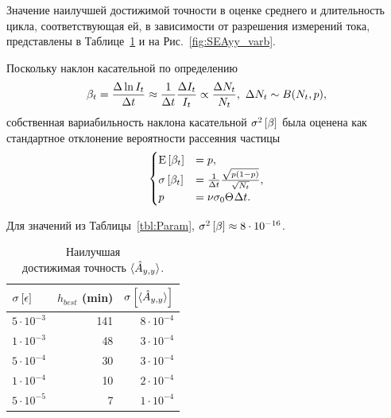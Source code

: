 \documentclass{article}
\begin{document}
	Значение наилучшей достижимой точности в оценке среднего и длительность цикла, соответствующая ей, в зависимости от разрешения измерений тока, представлены в Таблице~\ref{tbl:SEAyy_varb} и на Рис.~\ref{fig:SEAyy_varb}. 
		
	Поскольку наклон касательной по определению
	\[
	\slp[t] = \frac{\Delta \ln I_t}{\Delta t} \approx \frac{1}{\Delta t}\frac{\Delta I_t}{I_t} \propto \frac{\Delta N_t}{N_t}, ~\Delta N_t \sim B(N_t, p),
	\]
	собственная вариабильность наклона касательной $\v{\slp}$ была оценена как стандартное отклонение вероятности рассеяния частицы 
	\begin{equation*}
	\begin{cases}
	\Xpct{\slp[t]} 	&= p, \\
	\SE{\slp[t]}		&= \frac{1}{\Delta t}\frac{\sqrt{p(1-p)}}{\sqrt{N_t}}, \\
	p 				&= \nu\CS[0]\Thick\Delta t.
	\end{cases}
	\end{equation*}
	
	Для значений из Таблицы~\ref{tbl:Param}, $\v{\slp} \approx 8\cdot 10^{-16}$.
	
	\begin{table}[h]
		\centering
		\caption{Наилучшая\\ достижимая точность ${\avg{\Ayy*}}$.\label{tbl:SEAyy_varb}}
		\begin{tabular}{lrr}
			\hline\hline
			$\SE{\err}$			&	$h_{best}$ (min)	& $\SE{\avg{\Ayy*}}$\\
			\hline
			$5\cdot10^{-3}$		&	141					& $8\cdot10^{-4}$\\
			$1\cdot10^{-3}$		&	48					& $3\cdot10^{-4}$\\
			$5\cdot10^{-4}$		&	30					& $3\cdot10^{-4}$\\
			$1\cdot10^{-4}$		&	10					& $2\cdot10^{-4}$\\
			$5\cdot10^{-5}$		&	7					& $1\cdot10^{-4}$\\
			\hline
		\end{tabular}
	\end{table}
\end{document}
